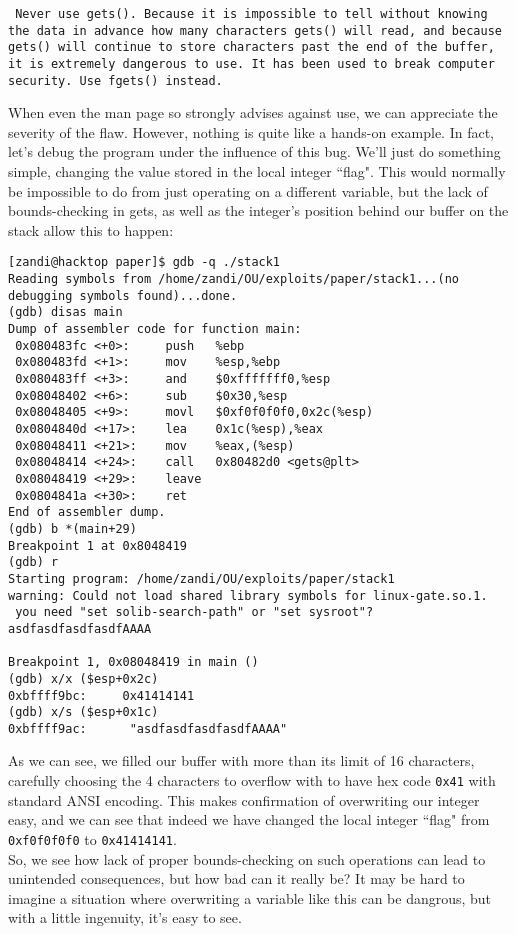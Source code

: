 \begin{sloppypar} %
\texttt{
Never use gets().  Because it is impossible to tell without knowing the
data in advance how many  characters  gets()  will  read,  and  because
gets() will continue to store characters past the end of the buffer, it
is extremely dangerous to use.  It has  been  used  to  break  computer
security.  Use fgets() instead.
}\\
\end{sloppypar}

When even the man page so strongly advises against use, we can appreciate the severity of the flaw.
However, nothing is quite like a hands-on example. In fact, let's debug the program under the influence of this bug.
We'll just do something simple, changing the value stored in the local integer ``flag". This would normally
be impossible to do from just operating on a different variable, but the lack of bounds-checking in gets, as 
well as the integer's position behind our buffer on the stack allow this to happen:

\begin{lstlisting}
[zandi@hacktop paper]$ gdb -q ./stack1
Reading symbols from /home/zandi/OU/exploits/paper/stack1...(no debugging symbols found)...done.
(gdb) disas main
Dump of assembler code for function main:
 0x080483fc <+0>:     push   %ebp
 0x080483fd <+1>:     mov    %esp,%ebp
 0x080483ff <+3>:     and    $0xfffffff0,%esp
 0x08048402 <+6>:     sub    $0x30,%esp
 0x08048405 <+9>:     movl   $0xf0f0f0f0,0x2c(%esp)
 0x0804840d <+17>:    lea    0x1c(%esp),%eax
 0x08048411 <+21>:    mov    %eax,(%esp)
 0x08048414 <+24>:    call   0x80482d0 <gets@plt>
 0x08048419 <+29>:    leave  
 0x0804841a <+30>:    ret    
End of assembler dump.
(gdb) b *(main+29)
Breakpoint 1 at 0x8048419
(gdb) r
Starting program: /home/zandi/OU/exploits/paper/stack1 
warning: Could not load shared library symbols for linux-gate.so.1.
 you need "set solib-search-path" or "set sysroot"?
asdfasdfasdfasdfAAAA

Breakpoint 1, 0x08048419 in main ()
(gdb) x/x ($esp+0x2c)
0xbffff9bc:     0x41414141
(gdb) x/s ($esp+0x1c)
0xbffff9ac:      "asdfasdfasdfasdfAAAA"
\end{lstlisting}
As we can see, we filled our buffer with more than its limit of 16 characters, carefully choosing the
4 characters to overflow with to have hex code \texttt{0x41} with standard ANSI encoding. This makes confirmation
of overwriting our integer easy, and we can see that indeed we have changed the local integer ``flag" from
\texttt{0xf0f0f0f0} to \texttt{0x41414141}.\\

So, we see how lack of proper bounds-checking on such operations can lead to unintended consequences,
but how bad can it really be? It may be hard to imagine a situation where overwriting a variable like
this can be dangrous, but with a little ingenuity, it's easy to see.\\


